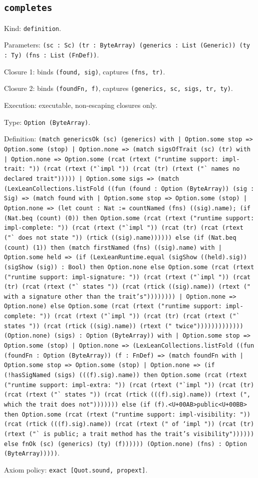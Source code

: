 \documentclass[11pt]{article}
\begin{document}
\subsection*{\texttt{completes}}
\noindent Kind: \texttt{definition}.\par
\noindent Parameters: \texttt{(sc : Sc) (tr : ByteArray) (generics : List (Generic)) (ty : Ty) (fns : List (FnDef))}.\par
\noindent Closure 1: binds \texttt{(found, sig)}, captures \texttt{(fns, tr)}.\par
\noindent Closure 2: binds \texttt{(foundFn, f)}, captures \texttt{(generics, sc, sigs, tr, ty)}.\par
\noindent Execution: executable, non-escaping closures only.\par
\noindent Type: \texttt{Option (ByteArray)}.\par
\noindent Definition: \texttt{(match genericsOk (sc) (generics) with | Option.some stop => Option.some (stop) | Option.none => (match sigsOfTrait (sc) (tr) with | Option.none => Option.some (rcat (rtext ("runtime support: impl-trait: ")) (rcat (rtext ("`impl ")) (rcat (tr) (rtext ("` names no declared trait"))))) | Option.some sigs => (match (LexLeanCollections.listFold ((fun (found : Option (ByteArray)) (sig : Sig) => (match found with | Option.some stop => Option.some (stop) | Option.none => (let count : Nat := countNamed (fns) ((sig).name); (if (Nat.beq (count) (0)) then Option.some (rcat (rtext ("runtime support: impl-complete: ")) (rcat (rtext ("`impl ")) (rcat (tr) (rcat (rtext ("` does not state ")) (rtick ((sig).name)))))) else (if (Nat.beq (count) (1)) then (match firstNamed (fns) ((sig).name) with | Option.some held => (if (LexLeanRuntime.equal (sigShow ((held).sig)) (sigShow (sig)) : Bool) then Option.none else Option.some (rcat (rtext ("runtime support: impl-signature: ")) (rcat (rtext ("`impl ")) (rcat (tr) (rcat (rtext ("` states ")) (rcat (rtick ((sig).name)) (rtext (" with a signature other than the trait's")))))))) | Option.none => Option.none) else Option.some (rcat (rtext ("runtime support: impl-complete: ")) (rcat (rtext ("`impl ")) (rcat (tr) (rcat (rtext ("` states ")) (rcat (rtick ((sig).name)) (rtext (" twice"))))))))))))) (Option.none) (sigs) : Option (ByteArray)) with | Option.some stop => Option.some (stop) | Option.none => (LexLeanCollections.listFold ((fun (foundFn : Option (ByteArray)) (f : FnDef) => (match foundFn with | Option.some stop => Option.some (stop) | Option.none => (if (!hasSigNamed (sigs) (((f).sig).name)) then Option.some (rcat (rtext ("runtime support: impl-extra: ")) (rcat (rtext ("`impl ")) (rcat (tr) (rcat (rtext ("` states ")) (rcat (rtick (((f).sig).name)) (rtext (", which the trait does not"))))))) else (if (f).<U+00AB>public<U+00BB> then Option.some (rcat (rtext ("runtime support: impl-visibility: ")) (rcat (rtick (((f).sig).name)) (rcat (rtext (" of `impl ")) (rcat (tr) (rtext ("` is public; a trait method has the trait's visibility")))))) else fnOk (sc) (generics) (ty) (f)))))) (Option.none) (fns) : Option (ByteArray)))))}.\par
\noindent Axiom policy: \texttt{exact [Quot.sound, propext]}.\par
\end{document}
